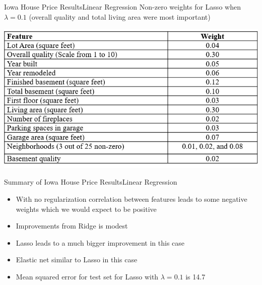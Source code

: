\documentclass[11pt]{beamer}
\begin{document}
\begin{frame}{Iowa House Price Results}{Linear Regression}
Non-zero weights for Lasso when $\lambda=0.1$ (overall quality and total living area were most important)
	 
	\begin{center}
	\includegraphics[scale=.6]{../05-pictures/lesson-3-1_pic_6.png}
	\end{center}
\end{frame}
\begin{frame}{Summary of Iowa House Price Results}{Linear Regression}
	\begin{itemize}
		\item With no regularization correlation between features leads to some negative weights which we would expect to be positive
		\item Improvements from Ridge is modest
		\item Lasso leads to a much bigger improvement in this case
		\item Elastic net similar to Lasso in this case
		\item Mean squared error for test set for Lasso with $\lambda=0.1$ is 14.7\\%
	\end{itemize}
\end{frame}

\end{document}
